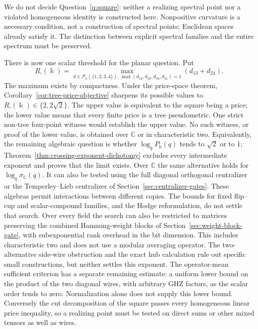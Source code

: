 \documentclass[11pt,a4paper]{article}
\newcommand{\C}{\mathbb C}
\newcommand{\kk}{\Bbbk}
\newcommand{\Price}{\mathcal P}
\theoremstyle{definition}
\theoremstyle{remark}
\begin{document}
We do not decide Question~\ref{q:square}: neither a realizing spectral
point nor a violated homogeneous identity is constructed here.
Nonpositive curvature is a necessary condition, not a construction
of spectral points; Euclidean spaces already satisfy it.
The distinction between explicit spectral families and the entire
spectrum must be preserved.

There is now one scalar threshold for the planar question. Put
\[
R_\square(\kk)=\max_{d\in\Price_\kk(\{1,2,3,4\}),\,
                    \max(d_{12},d_{23},d_{34},d_{41})=1}
                    (d_{13}+d_{24}).
\]
The maximum exists by compactness. Under the price-space theorem,
Corollary~\ref{cor:tree-price-objective} sharpens its possible values to
$R_\square(\kk)\in\{2,2\sqrt2\}$.
The upper value is equivalent to the square being a price;
the lower value means that every finite price is a tree pseudometric.
One strict non-tree four-point witness would establish the upper
value. No such witness, or proof of the lower value, is obtained
over $\mathbb C$ or in characteristic two.
Equivalently, the remaining algebraic question is whether
$\log_qP_\kk(q)$ tends to $\sqrt2$ or to $1$;
Theorem~\ref{thm:crossing-exponent-dichotomy} excludes every
intermediate exponent and proves that the limit exists.
Over $\C$ the same alternative holds for
$\log_q\sigma_\C(q)$.
It can also be tested using the full diagonal orthogonal centralizer
or the Temperley--Lieb centralizer of
Section~\ref{sec:centralizer-gates}. These algebras permit interactions
between different copies. The bounds for fixed flip--cup and scalar-compound families,
and the Hodge reformulation, do not settle that search.
Over every field the search can also be restricted to matrices
preserving the combined Hamming-weight blocks of
Section~\ref{sec:weight-block-gate}, with subexponential rank
overhead in the bit dimension. This includes characteristic two
and does not use a modular averaging operator.
The two-alternative side-wire obstruction and the exact hub
calculation rule out specific small constructions, but neither
settles this exponent.
The operator-mean sufficient criterion has a separate remaining
estimate: a uniform lower bound on the product of the two diagonal
wires, with arbitrary GHZ factors, as the scalar order tends to zero.
Normalization alone does not supply this lower bound.
Conversely the cut decomposition of the square passes every
homogeneous linear price inequality, so a realizing point must
be tested on direct sums or other mixed tensors as well as wires.
\end{document}
